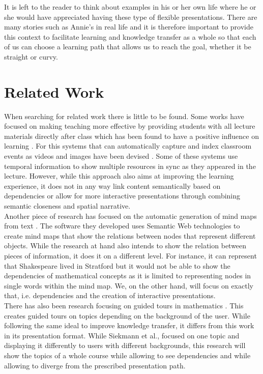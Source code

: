\documentclass[twoside, 12pt]{article}
\begin{document}
It is left to the reader to think about examples in his or her own life where he or she would have appreciated having these type of flexible presentations. There are many stories such as Annie's in real life and it is therefore important to provide this context to facilitate learning and knowledge transfer as a whole so that each of us can choose a learning path that allows us to reach the goal, whether it be straight or curvy.\\

\section{Related Work}
\label{sec:relatedworks}

When searching for related work there is little to be found. Some works have focused on making teaching more effective by providing students with all lecture materials directly after class which has been found to have a positive influence on learning \cite{DBLP:dblp_journals/tochi/BrothertonA04}. For this systems that can automatically capture and index classroom events as videos and images have been devised \cite{indexedclass:npentrel14}. Some of these systems use temporal information \cite{DBLP:dblp_journals/isci/ChungS97} to show multiple resources in sync as they appeared in the lecture. However, while this approach also aims at improving the learning experience, it does not in any way link content semantically based on dependencies or allow for more interactive presentations through combining semantic closeness and spatial narrative.\\

Another piece of research has focused on the automatic generation of mind maps from text \cite{abdeen2009direct}. The software they developed uses Semantic Web technologies to create mind maps that show the relations between nodes that represent different objects. While the research at hand also intends to show the relation between pieces of information, it does it on a different level. For instance, it can represent that Shakespeare lived in Stratford but it would not be able to show the dependencies of mathematical concepts as it is limited to representing nodes in single words within the mind map. We, on the other hand, will focus on exactly that, i.e. dependencies and the creation of interactive presentations.\\

There has also been research focusing on guided tours in mathematics \cite{SieBen:acgap00}. This creates guided tours on topics depending on the background of the user. While following the same ideal to improve knowledge transfer, it differs from this work in its presentation format. While Siekmann et al., focused on one topic and displaying it differently to users with different backgrounds, this research will show the topics of a whole course while allowing to see dependencies and while allowing to diverge from the prescribed presentation path.\\
\end{document}
